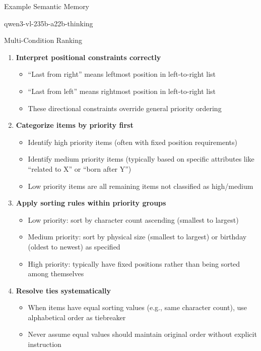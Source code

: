 \begin{promptbox}{Example Semantic Memory

qwen3-vl-235b-a22b-thinking

Multi-Condition Ranking}
\begin{enumerate}[label=\textbf{\arabic*.}]

  \item \textbf{Interpret positional constraints correctly}
    \begin{itemize}
      \item ``Last from right'' means leftmost position in left-to-right list
      \item ``Last from left'' means rightmost position in left-to-right list
      \item These directional constraints override general priority ordering
    \end{itemize}

  \item \textbf{Categorize items by priority first}
    \begin{itemize}
      \item Identify high priority items (often with fixed position requirements)
      \item Identify medium priority items (typically based on specific attributes like ``related to X'' or ``born after Y'')
      \item Low priority items are all remaining items not classified as high/medium
    \end{itemize}

  \item \textbf{Apply sorting rules within priority groups}
    \begin{itemize}
      \item Low priority: sort by character count ascending (smallest to largest)
      \item Medium priority: sort by physical size (smallest to largest) or birthday (oldest to newest) as specified
      \item High priority: typically have fixed positions rather than being sorted among themselves
    \end{itemize}

  \item \textbf{Resolve ties systematically}
    \begin{itemize}
      \item When items have equal sorting values (e.g., same character count), use alphabetical order as tiebreaker
      \item Never assume equal values should maintain original order without explicit instruction
    \end{itemize}


\end{enumerate}
\end{promptbox}

